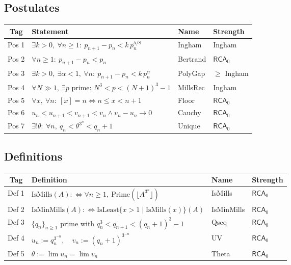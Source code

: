 \documentclass[11pt,reqno]{amsart}
\theoremstyle{redplain}
\numberwithin{equation}{section}
\begin{document}
\subsection{Postulates}

\label{sec:postulates}

\begin{center}
{\small 
\begin{tabular}{|c|m{5.0cm}|m{2.0cm}|m{1.8cm}|}
\hline
\textbf{Tag} & \textbf{Statement} & \textbf{Name} & \textbf{Strength} \\ 
\hline
Pos 1 & $\exists k>0,\ \forall n\ge1:\ p_{n+1}-p_n<k\,p_n^{5/8}$ & Ingham & 
Ingham \\ \hline
Pos 2 & $\forall n\ge1:\ p_{n+1}-p_n<p_n$ & Bertrand & $\mathsf{RCA}_0$ \\ 
\hline
Pos 3 & $\exists k>0,\ \exists\alpha<1,\ \forall n:\
p_{n+1}-p_n<k\,p_n^{\alpha}$ & PolyGap & $\ge$ Ingham \\ \hline
Pos 4 & $\forall N\gg1,\ \exists p$ prime: $N^3<p<(N+1)^3-1$ & MillsRec & 
Ingham \\ \hline
Pos 5 & $\forall x,\ \forall n:\ [x]=n\iff n\le x<n+1$ & Floor & $\mathsf{RCA%
}_0$ \\ \hline
Pos 6 & $u_n<u_{n+1}<v_{n+1}<v_n\wedge v_n-u_n\to0$ & Cauchy & $\mathsf{RCA}%
_0$ \\ \hline
Pos 7 & $\exists!\theta:\ \forall n,\ q_n<\theta^{3^n}<q_n+1$ & Unique & $%
\mathsf{RCA}_0$ \\ \hline
\end{tabular}
}
\end{center}

\subsection{Definitions}

\label{sec:definitions-tab}

\begin{center}
{\small 
\begin{tabular}{|c|m{6.0cm}|m{2.2cm}|m{1.8cm}|}
\hline
\textbf{Tag} & \textbf{Definition} & \textbf{Name} & \textbf{Strength} \\ 
\hline
Def 1 & $\mathrm{IsMills}(A):\iff\forall n\ge1,\ \mathrm{Prime}(\lfloor
A^{3^n}\rfloor)$ & IsMills & $\mathsf{RCA}_0$ \\ \hline
Def 2 & $\mathrm{IsMinMills}(A):\iff\mathrm{IsLeast}\{x>1\mid\mathrm{IsMills}%
(x)\}(A)$ & IsMinMills & $\mathsf{RCA}_0$ \\ \hline
Def 3 & $\{q_n\}_{n\ge1}$ prime with $q_n^3<q_{n+1}<(q_n+1)^3-1$ & Qseq & $%
\mathsf{RCA}_0$ \\ \hline
Def 4 & $u_n:=q_n^{3^{-n}},\quad v_n:=(q_n+1)^{3^{-n}}$ & UV & $\mathsf{RCA}%
_0$ \\ \hline
Def 5 & $\theta:=\lim u_n=\lim v_n$ & Theta & $\mathsf{RCA}_0$ \\ \hline
\end{tabular}
}
\end{center}
\end{document}
